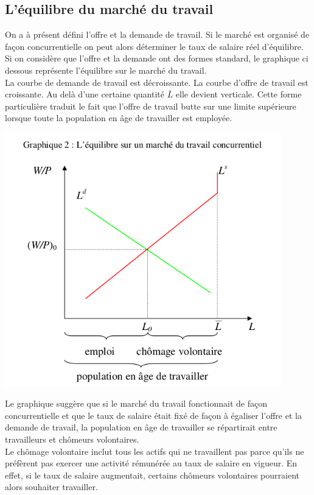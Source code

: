 \documentclass[10pt]{book}
\begin{document}
\subsection{L'équilibre du marché du travail}
On a à présent défini l'offre et la demande de travail. Si le marché est organisé de façon concurrentielle on peut alors déterminer le taux de salaire réel d'équilibre. Si on considère que l'offre et la demande ont des formes standard, le graphique ci dessous représente l'équilibre sur le marché du travail. \\
La courbe de demande de travail est décroissante. La courbe d'offre de travail est croissante. Au delà d'une certaine quantité $\overline{L}$ elle devient verticale. Cette forme particulière traduit le fait que l'offre de travail butte sur une limite supérieure lorsque toute la population en âge de travailler est employée.
\begin{center}
  \includegraphics[width=12cm]{graph43.png}
\end{center}
Le graphique suggère que si le marché du travail fonctionnait de façon concurrentielle et que le taux de salaire était fixé de façon à égaliser l'offre et la demande de travail, la population en âge de travailler se répartirait entre travailleurs et chômeurs volontaires. \\
Le chômage volontaire inclut tous les actifs qui ne travaillent pas parce qu'ils ne préfèrent pas exercer une activité rémunérée au taux de salaire en vigueur. En effet, si le taux de salaire augmentait, certains chômeurs volontaires pourraient alors souhaiter travailler. \\
\end{document}
